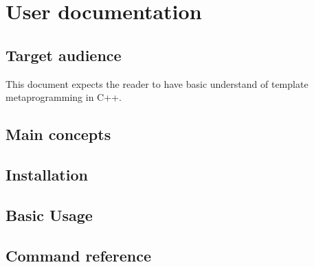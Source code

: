 
\chapter{User documentation}

\section{Target audience}

This document expects the reader to have basic understand of template
metaprogramming in C++.

\section{Main concepts}

\section{Installation}

\section{Basic Usage}

\section{Command reference}

